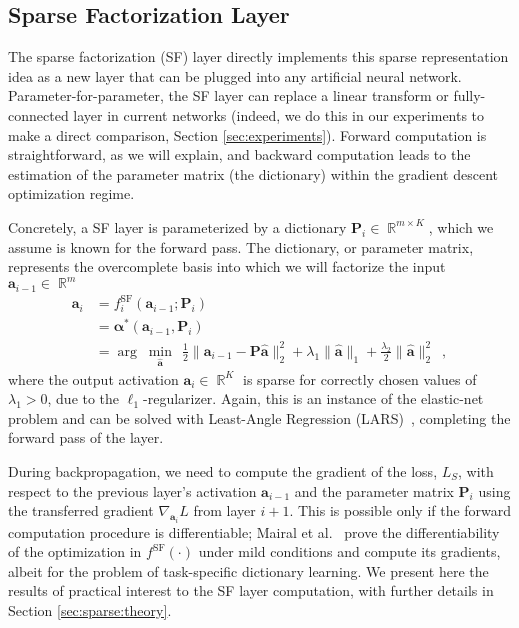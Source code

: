 \documentclass[10pt,twocolumn,letterpaper]{article}
\newcommand{\reals}{\mathop \mathbb{R}}
\newcommand{\argmnmz}[1][]{\ensuremath{\arg\;\underset{#1}{\min}\:\:}}
\renewcommand{\vec}{\mathbf}
\newcommand{\grad}[2]{\nabla_{\!\! #1} #2}
\renewcommand{\P}{\vec{P}}
\renewcommand{\a}{\vec{a}}
\newcommand{\balpha}{\boldsymbol{\alpha}}
\newcommand{\fSF}{^{\text{SF}}}
\begin{document}

\subsection{Sparse Factorization Layer}
\label{sec:sflayer}

The sparse factorization (SF) layer directly implements this sparse representation idea as a new layer that can be plugged into any artificial neural network.  Parameter-for-parameter, the SF layer can replace a linear transform or fully-connected layer in current networks (indeed, we do this in our experiments to make a direct comparison, Section \ref{sec:experiments}).  Forward computation is straightforward, as we will explain, and backward computation leads to the estimation of the parameter matrix (the dictionary) within the gradient descent optimization regime. 

Concretely, a SF layer is parameterized by a dictionary $\P_i\in\reals^{m\times 
K}$, which we assume is known for the forward pass.  The dictionary, or 
parameter matrix, represents the overcomplete basis into which we will 
factorize the input $\a_{i-1}\in\reals^m$ 
%
\begin{align}
    \a_i & = f\fSF_i(\a_{i-1};\P_i) \label{eq:sflayer}\\
         & = \balpha^*(\a_{i-1},\P_i) \nonumber\\
         & = \argmnmz[\hat{\a}] \frac{1}{2}  \lVert 
         \a_{i-1}-\P\hat{\a}\rVert_2^2 +
      \lambda_1\lVert\hat{\a}\rVert_1+\frac{\lambda_2}{2}\lVert\hat{\a}\rVert_2^2
\enspace,
\nonumber
\end{align}
%
\noindent where the output activation $\a_i \in \reals^{K}$ is sparse for 
correctly chosen values of $\lambda_1>0$, due to the $\ell_1$-regularizer.  
Again, this is an instance of the elastic-net problem and can be solved with 
Least-Angle Regression (LARS)~\cite{EfHaJoAnnals2004}, completing the forward 
pass of the layer.

During backpropagation, we need to compute the gradient of the loss, $L_S$, with respect to the previous layer's activation $\a_{i-1}$ and the parameter matrix $\P_i$ using the transferred gradient $\grad{\a_i}{L}$ from layer $i+1$. This is possible only if the forward computation procedure is differentiable; Mairal et al.~\cite{MaBaPoTPAMI2012} prove the differentiability of the optimization in $f\fSF(\cdot)$ under mild conditions and compute its gradients, albeit for the problem of task-specific dictionary learning. We present here the results of practical interest to the SF layer computation, with further details in Section \ref{sec:sparse:theory}.
\end{document}

